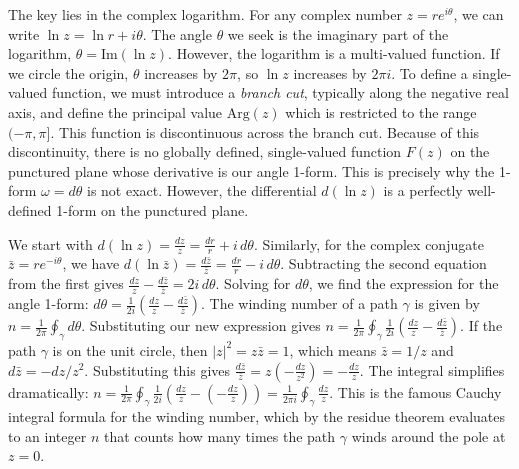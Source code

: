 \begin{solution}
    The key lies in the complex logarithm.
    For any complex number $z = re^{i\theta}$, we can write $\ln z = \ln r + i\theta$.
    The angle $\theta$ we seek is the imaginary part of the logarithm, $\theta = \text{Im}(\ln z)$.
    However, the logarithm is a multi-valued function.
    If we circle the origin, $\theta$ increases by $2\pi$, so $\ln z$ increases by $2\pi i$.
    To define a single-valued function, we must introduce a \textit{branch cut}, typically along the negative real axis, and define the principal value $\text{Arg}(z)$ which is restricted to the range $(-\pi, \pi]$.
    This function is discontinuous across the branch cut.
    Because of this discontinuity, there is no globally defined, single-valued function $F(z)$ on the punctured plane whose derivative is our angle 1-form.
    This is precisely why the 1-form $\omega = d\theta$ is not exact.
    However, the differential $d(\ln z)$ is a perfectly well-defined 1-form on the punctured plane.
    
    We start with $d(\ln z) = \frac{dz}{z} = \frac{dr}{r} + i\,d\theta$.
    Similarly, for the complex conjugate $\bar{z} = re^{-i\theta}$, we have $d(\ln \bar{z}) = \frac{d\bar{z}}{\bar{z}} = \frac{dr}{r} - i\,d\theta$.
    Subtracting the second equation from the first gives $\frac{dz}{z} - \frac{d\bar{z}}{\bar{z}} = 2i\,d\theta$.
    Solving for $d\theta$, we find the expression for the angle 1-form: $d\theta = \frac{1}{2i} \left( \frac{dz}{z} - \frac{d\bar{z}}{\bar{z}} \right)$.
    The winding number of a path $\gamma$ is given by $n = \frac{1}{2\pi} \oint_\gamma d\theta$.
    Substituting our new expression gives $n = \frac{1}{2\pi} \oint_\gamma \frac{1}{2i} \left( \frac{dz}{z} - \frac{d\bar{z}}{\bar{z}} \right)$.
    If the path $\gamma$ is on the unit circle, then $|z|^2 = z\bar{z} = 1$, which means $\bar{z} = 1/z$ and $d\bar{z} = -dz/z^2$.
    Substituting this gives $\frac{d\bar{z}}{\bar{z}} = z \left( -\frac{dz}{z^2} \right) = -\frac{dz}{z}$.
    The integral simplifies dramatically: $n = \frac{1}{2\pi} \oint_\gamma \frac{1}{2i} \left( \frac{dz}{z} - \left(-\frac{dz}{z}\right) \right) = \frac{1}{2\pi i} \oint_\gamma \frac{dz}{z}$.
    This is the famous Cauchy integral formula for the winding number, which by the residue theorem evaluates to an integer $n$ that counts how many times the path $\gamma$ winds around the pole at $z=0$.
\end{solution}
